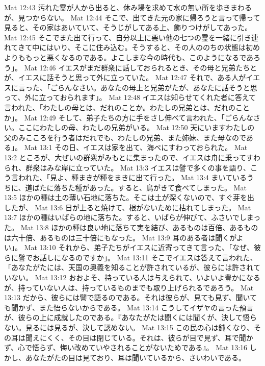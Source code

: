 Mat 12:43  汚れた霊が人から出ると、休み場を求めて水の無い所を歩きまわるが、見つからない。
Mat 12:44  そこで、出てきた元の家に帰ろうと言って帰って見ると、その家はあいていて、そうじがしてある上、飾りつけがしてあった。
Mat 12:45  そこでまた出て行って、自分以上に悪い他の七つの霊を一緒に引き連れてきて中にはいり、そこに住み込む。そうすると、その人ののちの状態は初めよりももっと悪くなるのである。よこしまな今の時代も、このようになるであろう」。
Mat 12:46  イエスがまだ群衆に話しておられるとき、その母と兄弟たちとが、イエスに話そうと思って外に立っていた。
Mat 12:47  それで、ある人がイエスに言った、「ごらんなさい。あなたの母上と兄弟がたが、あなたに話そうと思って、外に立っておられます」。
Mat 12:48  イエスは知らせてくれた者に答えて言われた、「わたしの母とは、だれのことか。わたしの兄弟とは、だれのことか」。
Mat 12:49  そして、弟子たちの方に手をさし伸べて言われた、「ごらんなさい。ここにわたしの母、わたしの兄弟がいる。
Mat 12:50  天にいますわたしの父のみこころを行う者はだれでも、わたしの兄弟、また姉妹、また母なのである」。
Mat 13:1  その日、イエスは家を出て、海べにすわっておられた。
Mat 13:2  ところが、大ぜいの群衆がみもとに集まったので、イエスは舟に乗ってすわられ、群衆はみな岸に立っていた。
Mat 13:3  イエスは譬で多くの事を語り、こう言われた、「見よ、種まきが種をまきに出て行った。
Mat 13:4  まいているうちに、道ばたに落ちた種があった。すると、鳥がきて食べてしまった。
Mat 13:5  ほかの種は土の薄い石地に落ちた。そこは土が深くないので、すぐ芽を出したが、
Mat 13:6  日が上ると焼けて、根がないために枯れてしまった。
Mat 13:7  ほかの種はいばらの地に落ちた。すると、いばらが伸びて、ふさいでしまった。
Mat 13:8  ほかの種は良い地に落ちて実を結び、あるものは百倍、あるものは六十倍、あるものは三十倍にもなった。
Mat 13:9  耳のある者は聞くがよい」。
Mat 13:10  それから、弟子たちがイエスに近寄ってきて言った、「なぜ、彼らに譬でお話しになるのですか」。
Mat 13:11  そこでイエスは答えて言われた、「あなたがたには、天国の奥義を知ることが許されているが、彼らには許されていない。
Mat 13:12  おおよそ、持っている人は与えられて、いよいよ豊かになるが、持っていない人は、持っているものまでも取り上げられるであろう。
Mat 13:13  だから、彼らには譬で語るのである。それは彼らが、見ても見ず、聞いても聞かず、また悟らないからである。
Mat 13:14  こうしてイザヤの言った預言が、彼らの上に成就したのである。『あなたがたは聞くには聞くが、決して悟らない。見るには見るが、決して認めない。
Mat 13:15  この民の心は鈍くなり、その耳は聞えにくく、その目は閉じている。それは、彼らが目で見ず、耳で聞かず、心で悟らず、悔い改めていやされることがないためである』。
Mat 13:16  しかし、あなたがたの目は見ており、耳は聞いているから、さいわいである。
